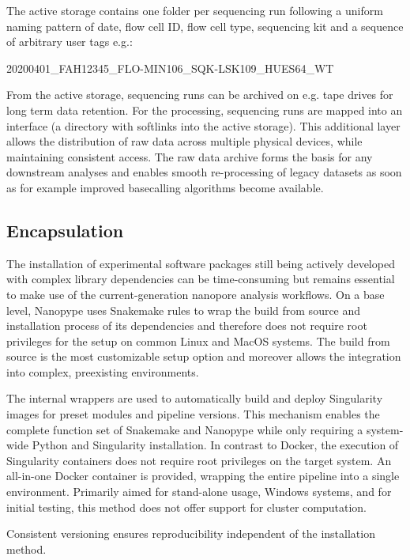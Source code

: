 The active storage contains one folder per sequencing run following a uniform naming pattern of date, flow cell ID, flow cell type, sequencing kit and a sequence of arbitrary user tags e.g.:

\begin{center}
	20200401\_FAH12345\_FLO-MIN106\_SQK-LSK109\_HUES64\_WT
\end{center}

From the active storage, sequencing runs can be archived on e.g. tape drives for long term data retention. For the processing, sequencing runs are mapped into an interface (a directory with softlinks into the active storage). This additional layer allows the distribution of raw data across multiple physical devices, while maintaining consistent access.
The raw data archive forms the basis for any downstream analyses and enables smooth re-processing of legacy datasets as soon as for example improved basecalling algorithms become available.

\subsection{Encapsulation}
\label{subsec:nanopype:encapsulation}
The installation of experimental software packages still being actively developed with complex library dependencies can be time-consuming but remains essential to make use of the current-generation nanopore analysis workflows. On a base level, Nanopype uses Snakemake rules to wrap the build from source and installation process of its dependencies and therefore does not require root privileges for the setup on common Linux and MacOS systems. The build from source is the most customizable setup option and moreover allows the integration into complex, preexisting environments.

The internal wrappers are used to automatically build and deploy Singularity images for preset modules and pipeline versions. This mechanism enables the complete function set of Snakemake and Nanopype while only requiring a system-wide Python and Singularity installation. In contrast to Docker, the execution of Singularity containers does not require root privileges on the target system.
An all-in-one Docker container is provided, wrapping the entire pipeline into a single environment. Primarily aimed for stand-alone usage, Windows systems, and for initial testing, this method does not offer support for cluster computation. 



Consistent versioning ensures reproducibility independent of the installation method.

